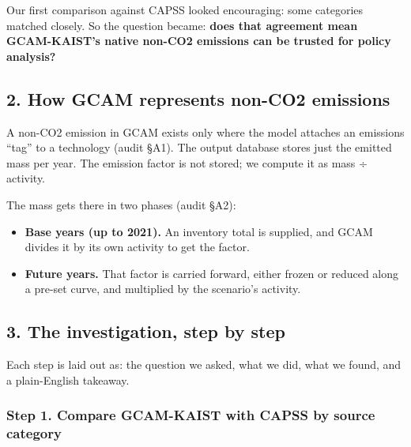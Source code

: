 Our first
comparison
against
CAPSS
looked
encouraging:
some
categories
matched
closely.
So the
question
became:
\textbf{does
that
agreement
mean
GCAM-KAIST's
native
non-CO2
emissions
can be
trusted
for policy
analysis?}

\hypertarget{how-gcam-represents-non-co2-emissions}{%
\subsection*{2. How GCAM represents non-CO2 emissions \plainmark{}}\label{how-gcam-represents-non-co2-emissions}}

A non-CO2
emission
in GCAM
exists
only where
the model
attaches
an
emissions
``tag'' to
a
technology
(audit
§A1). The
output
database
stores
just the
emitted
mass per
year. The
emission
factor is
not
stored; we
compute it
as mass ÷
activity.

The mass
gets there
in two
phases
(audit
§A2):

\begin{itemize}
\tightlist
\item
  \textbf{Base
  years
  (up to
  2021).}
  An
  inventory
  total is
  supplied,
  and GCAM
  divides
  it by
  its own
  activity
  to get
  the
  factor.
\item
  \textbf{Future
  years.}
  That
  factor
  is
  carried
  forward,
  either
  frozen
  or
  reduced
  along a
  pre-set
  curve,
  and
  multiplied
  by the
  scenario's
  activity.
\end{itemize}

\hypertarget{the-investigation-step-by-step}{%
\subsection*{3. The investigation, step by step}\label{the-investigation-step-by-step}}

Each step
is laid
out as:
the
question
we asked,
what we
did, what
we found,
and a
plain-English
takeaway.

\hypertarget{step-1.-compare-gcam-kaist-with-capss-by-source-category}{%
\subsubsection*{Step 1. Compare GCAM-KAIST with CAPSS by source category}\label{step-1.-compare-gcam-kaist-with-capss-by-source-category}}


